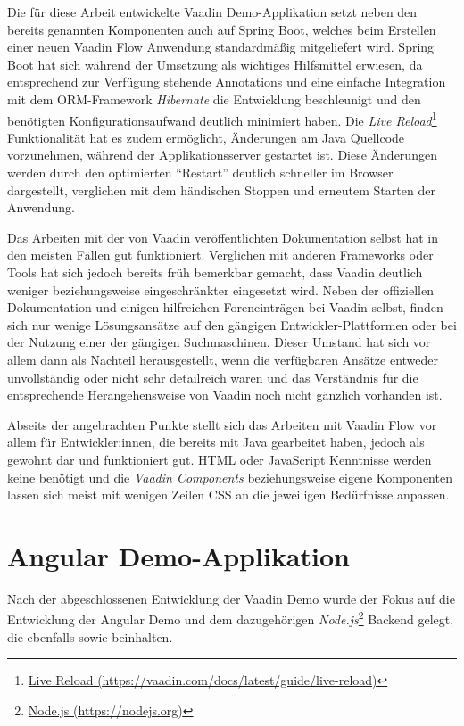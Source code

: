 \documentclass[a4paper,12pt,twoside]{scrreprt}
\begin{document}
Die für diese Arbeit entwickelte Vaadin Demo-Applikation setzt neben den bereits genannten Komponenten auch auf Spring Boot, welches beim Erstellen einer neuen Vaadin Flow Anwendung standardmäßig mitgeliefert wird. Spring Boot hat sich während der Umsetzung als wichtiges Hilfsmittel erwiesen, da entsprechend zur Verfügung stehende Annotations und eine einfache Integration mit dem ORM-Framework \textit{Hibernate} die Entwicklung beschleunigt und den benötigten Konfigurationsaufwand deutlich minimiert haben. Die \textit{Live Reload}\footnote{\href{https://vaadin.com/docs/latest/guide/live-reload}{Live Reload (https://vaadin.com/docs/latest/guide/live-reload)}} Funktionalität hat es zudem ermöglicht, Änderungen am Java Quellcode vorzunehmen, während der Applikationsserver gestartet ist. Diese Änderungen werden durch den optimierten \enquote{Restart} deutlich schneller im Browser dargestellt, verglichen mit dem händischen Stoppen und erneutem Starten der Anwendung.

\medskip

Das Arbeiten mit der von Vaadin veröffentlichten Dokumentation selbst hat in den meisten Fällen gut funktioniert. Verglichen mit anderen Frameworks oder Tools hat sich jedoch bereits früh bemerkbar gemacht, dass Vaadin deutlich weniger beziehungsweise eingeschränkter eingesetzt wird. Neben der offiziellen Dokumentation und einigen hilfreichen Foreneinträgen bei Vaadin selbst, finden sich nur wenige Lösungsansätze auf den gängigen Entwickler-Plattformen oder bei der Nutzung einer der gängigen Suchmaschinen. Dieser Umstand hat sich vor allem dann als Nachteil herausgestellt, wenn die verfügbaren Ansätze entweder unvollständig oder nicht sehr detailreich waren und das Verständnis für die entsprechende Herangehensweise von Vaadin noch nicht gänzlich vorhanden ist.

\medskip

Abseits der angebrachten Punkte  stellt sich das Arbeiten mit Vaadin Flow vor allem für Entwickler:innen, die bereits mit Java gearbeitet haben, jedoch als gewohnt dar und funktioniert gut. HTML oder JavaScript Kenntnisse werden keine benötigt und die \textit{Vaadin Components} beziehungsweise eigene Komponenten lassen sich meist mit wenigen Zeilen \ac{CSS} an die jeweiligen Bedürfnisse anpassen.

\section{Angular Demo-Applikation}
\label{sec:angular-demo}
Nach der abgeschlossenen Entwicklung der Vaadin Demo wurde der Fokus auf die Entwicklung der Angular Demo und dem dazugehörigen \textit{Node.js}\footnote{\href{https://https://nodejs.org/}{Node.js (https://nodejs.org)}} Backend gelegt, die ebenfalls \textit{} sowie \textit{} beinhalten.
\end{document}

